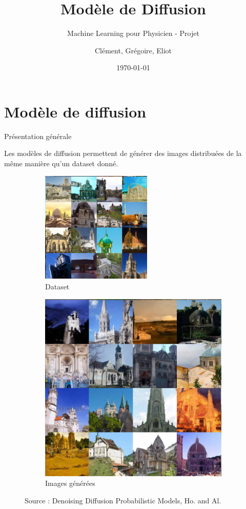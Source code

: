 \documentclass{beamer}
\begin{document}
	
	\title{Modèle de Diffusion}
	\subtitle{Machine Learning pour Physicien - Projet}
	\author{Clément, Grégoire, Eliot}
	\date{\today}
	
	\maketitle
	
	\section{Modèle de diffusion}
	
	\begin{frame}{Présentation générale}
		
		Les modèles de diffusion permettent de générer des images distribuées \alert{de la même manière} qu'un dataset donné.
		
		\begin{figure}
			\centering
			\begin{subfigure}[b]{0.4\textwidth}
				\centering
				\includegraphics[scale=0.36]{imgs/Church_dataset.png}
				\caption*{Dataset}
			\end{subfigure}
			\begin{subfigure}[b]{0.4\textwidth}
				\centering
				\includegraphics[scale=0.15]{imgs/Church_generated.png}
				\caption*{Images générées}
			\end{subfigure}
			\hfill
			\caption{Source : Denoising Diffusion Probabilistic Models, Ho. and Al.}
		\end{figure}
		

\end{frame}
\end{document}
